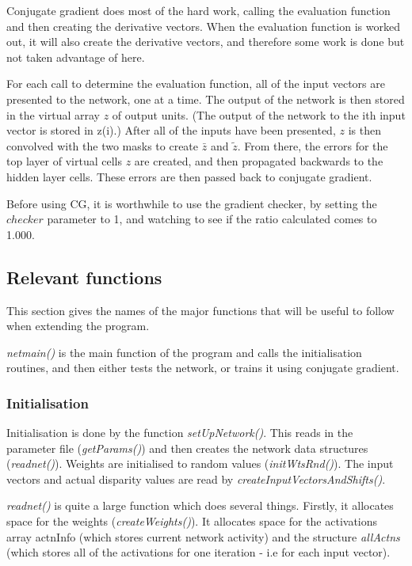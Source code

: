 \documentclass[a4paper]{article}
\newcommand{\zbar}{\bar{z}}
\newcommand{\ztilde}{\tilde{z}}
\begin{document}
Conjugate gradient does most of the hard work, calling the evaluation
function and then creating the derivative vectors.  When the
evaluation function is worked out, it will also create the derivative
vectors, and therefore some work is done but not taken advantage of
here.  

For each call to determine the evaluation function, all of the input
vectors are presented to the network, one at a time.  The output of
the network is then stored in the virtual array $z$ of output units.
(The output of the network to the ith input vector is stored in z(i).)
After all of the inputs have been presented, $z$ is then convolved
with the two masks to create $\zbar$ and $\ztilde$.  From there,
the errors for the top layer of virtual cells $z$ are created, and
then propagated backwards to the hidden layer cells.  These errors are
then passed back to conjugate gradient.

Before using CG, it is worthwhile to use the gradient checker, by
setting the $checker$ parameter to 1, and watching to see if the ratio
calculated comes to 1.000.

\subsection{Relevant functions}

This section gives the names of the major functions that will be
useful to follow when extending the program.

{\em netmain()} is the main function of the program and calls the
initialisation routines, and then either tests the network, or trains
it using conjugate gradient.

\subsubsection{Initialisation}

Initialisation is done by the function {\em setUpNetwork()}.  This reads in
the parameter file ({\em getParams()}) and then creates the network data
structures ({\em readnet()}).  Weights are initialised to random values
({\em initWtsRnd()}).  The input vectors and actual disparity values are read
by {\em createInputVectorsAndShifts()}.  

{\em readnet()} is quite a large function which does several things.
Firstly, it allocates space for the weights ({\em createWeights()}). It
allocates space for the activations array actnInfo (which stores
current network activity) and the structure {\em allActns} (which stores all
of the activations for one iteration - i.e for each input vector).
\end{document}
